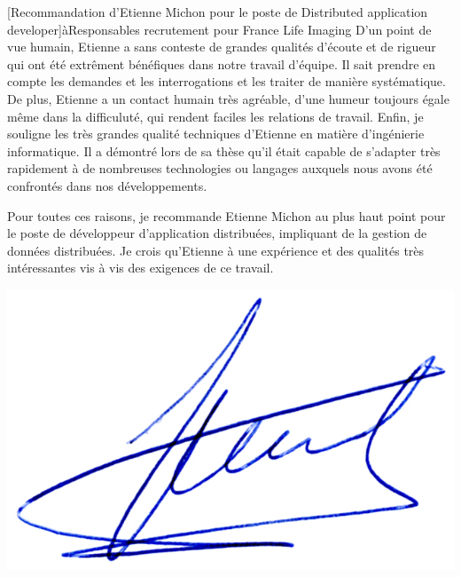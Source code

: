 \documentclass[a4paper,10pt]{article}
\begin{document}
\begin{letter}[Recommandation d'Etienne Michon pour le poste de Distributed application developer]{à}{Responsables recrutement pour France Life Imaging}
D'un point de  vue humain, Etienne a sans conteste  de grandes qualités d'écoute
et de rigueur  qui ont été extrêment bénéfiques dans  notre travail d'équipe. Il
sait prendre  en compte  les demandes  et les interrogations  et les  traiter de
manière systématique. De plus, Etienne a  un contact humain très agréable, d'une
humeur toujours égale même dans la difficuluté, qui rendent faciles les relations
de travail.
Enfin, je souligne les très grandes qualité techniques d'Etienne en matière
d'ingénierie informatique. Il a démontré lors de sa thèse qu'il était capable de
s'adapter très rapidement  à de nombreuses technologies ou langages auxquels
nous avons été confrontés dans nos développements.

Pour toutes ces raisons, je recommande Etienne Michon au plus haut point pour le
poste  de développeur  d'application distribuées,  impliquant de  la gestion  de
données  distribuées. Je  crois  qu'Etienne  à une  expérience  et des  qualités
très intéressantes vis à vis des exigences de ce travail.

\end{letter}
\begin{flushright}
\includegraphics[width=.20\textwidth]{signgenaud.jpg}
\end{flushright}
\end{document}
